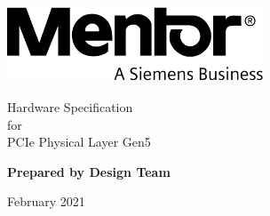 \begin{titlepage}
    \begin{center}
\includegraphics[height=0.9in,width=3in]{images/mentor.png}
        \vspace*{3cm}
            
        \Huge
        Hardware Specification
        \\
            for
        \\
        PCIe Physical Layer Gen5
        \\
        \vspace{0.5cm}

        \vspace{1.5cm}
            
        \textbf{Prepared by Design Team}
            
         \vspace{6cm}
      
         February 2021
            
    \end{center}
\end{titlepage}
